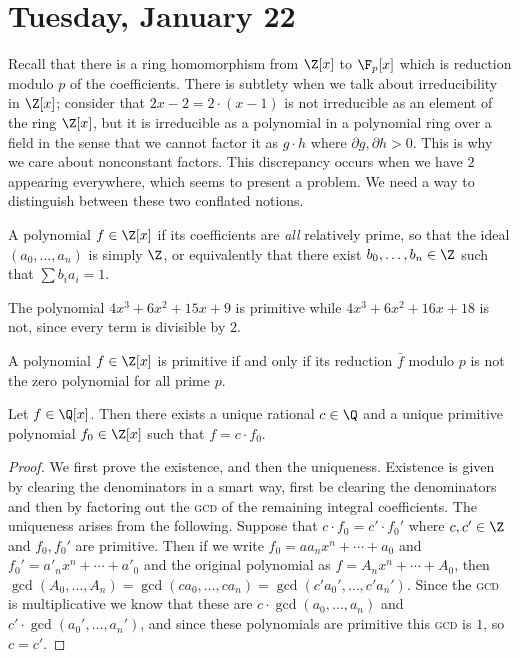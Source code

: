 
\section{Tuesday, January 22}

Recall that there is a ring homomorphism from $\Z[x]$ to $\F_p[x]$ which is reduction modulo $p$ of the coefficients. There is subtlety when we talk about irreducibility in $\Z[x]$; consider that $2x-2 = 2 \cdot (x-1)$ is not irreducible as an element of the ring $\Z[x]$, but it is irreducible as a polynomial in a polynomial ring over a field in the sense that we cannot factor it as $g\cdot h$ where $\partial g, \partial h > 0$. This is why we care about nonconstant factors. This discrepancy occurs when we have $2$ appearing everywhere, which seems to present a problem. We need a way to distinguish between these two conflated notions.

\begin{definition}[Primitive]
A polynomial $f \in \Z[x]$ if its coefficients are \emph{all} relatively prime, so that the ideal $(a_0, \dotsc, a_n)$ is simply $\Z$, or equivalently that there exist $b_0,\dotsc,b_n \in \Z$ such that $\sum b_ia_i = 1$.
\end{definition}

\begin{example}
The polynomial $4x^3 + 6x^2 + 15x + 9$ is primitive while $4x^3 + 6x^2 + 16x + 18$ is not, since every term is divisible by $2$.
\end{example}

\begin{proposition}
A polynomial $f \in \Z[x]$ is primitive if and only if its reduction $\bar{f}$ modulo $p$ is not the zero polynomial for all prime $p$.
\end{proposition}

\begin{lemma}
Let $f \in \Q[x]$. Then there exists a unique rational $c \in \Q$ and a unique primitive polynomial $f_0 \in \Z[x]$ such that $f = c \cdot f_0$.
\end{lemma}

\begin{proof}
We first prove the existence, and then the uniqueness. Existence is given by clearing the denominators in a smart way, first be clearing the denominators and then by factoring out the \textsc{gcd} of the remaining integral coefficients. The uniqueness arises from the following. Suppose that $c \cdot f_0 = c' \cdot f_0'$ where $c,c' \in \Z$ and $f_0,f_0'$ are primitive. Then if we write $f_0 = aa_nx^n + \cdots + a_0$ and $f_0' = a'_nx^n + \cdots + a'_0$ and the original polynomial as $f = A_nx^n + \cdots + A_0$, then $\gcd(A_0, \dotsc, A_n) = \gcd(ca_0, \dotsc, ca_n) = \gcd(c'a_0', \dotsc, c'a_n')$. Since the \textsc{gcd} is multiplicative we know that these are $c \cdot \gcd(a_0, \dotsc, a_n)$ and $c' \cdot \gcd(a_0', \dotsc, a_n')$, and since these polynomials are primitive this \textsc{gcd} is $1$, so $c = c'$.
\end{proof}

